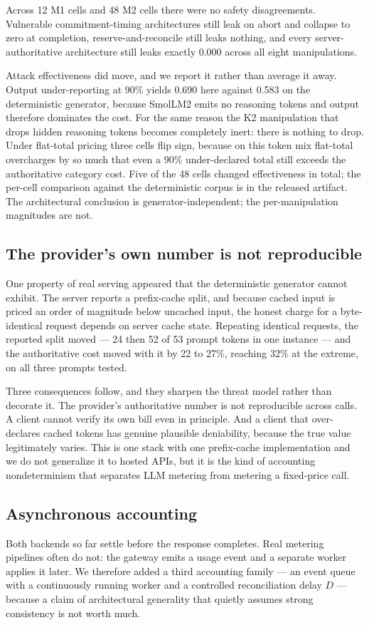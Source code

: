 \documentclass[preprint,3p,authoryear,12pt]{elsarticle}
\begin{document}
Across 12 M1 cells and 48 M2 cells there were no safety disagreements. Vulnerable
commitment-timing architectures still leak on abort and collapse to zero at completion,
reserve-and-reconcile still leaks nothing, and every server-authoritative architecture
still leaks exactly 0.000 across all eight manipulations.

Attack effectiveness did move, and we report it rather than average it away. Output
under-reporting at 90\% yields 0.690 here against 0.583 on the deterministic generator,
because SmolLM2 emits no reasoning tokens and output therefore dominates the cost. For
the same reason the K2 manipulation that drops hidden reasoning tokens becomes completely
inert: there is nothing to drop. Under flat-total pricing three cells flip sign, because
on this token mix flat-total overcharges by so much that even a 90\% under-declared total
still exceeds the authoritative category cost. Five of the 48 cells changed effectiveness
in total; the per-cell comparison against the deterministic corpus is in the released
artifact. The architectural conclusion is generator-independent; the per-manipulation
magnitudes are not.

\subsection{The provider's own number is not reproducible}
One property of real serving appeared that the deterministic generator cannot exhibit.
The server reports a prefix-cache split, and because cached input is priced an order of
magnitude below uncached input, the honest charge for a byte-identical request depends on
server cache state. Repeating identical requests, the reported split moved --- 24 then 52
of 53 prompt tokens in one instance --- and the authoritative cost moved with it by 22 to
27\%, reaching 32\% at the extreme, on all three prompts tested.

Three consequences follow, and they sharpen the threat model rather than decorate it.
The provider's authoritative number is not reproducible across calls. A client cannot
verify its own bill even in principle. And a client that over-declares cached tokens has
genuine plausible deniability, because the true value legitimately varies. This is one
stack with one prefix-cache implementation and we do not generalize it to hosted APIs,
but it is the kind of accounting nondeterminism that separates LLM metering from metering
a fixed-price call.

\subsection{Asynchronous accounting}
\label{sec:async}
Both backends so far settle before the response completes. Real metering pipelines
often do not: the gateway emits a usage event and a separate worker applies it later. We
therefore added a third accounting family --- an event queue with a continuously running
worker and a controlled reconciliation delay $D$ --- because a claim of architectural
generality that quietly assumes strong consistency is not worth much.
\end{document}
